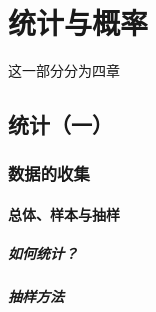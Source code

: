 \part{统计与概率}
这一部分分为四章
\chapter{统计（一）}


\section{数据的收集}
\subsection{总体、样本与抽样}
\clearpage
\subsubsection{如何统计？}
\clearpage
\subsubsection{抽样方法}
\clearpage
